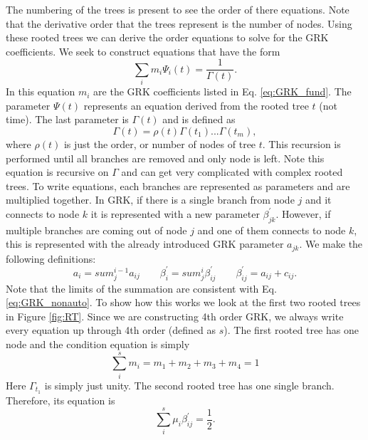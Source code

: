 \documentclass{ansconf}
\numberwithin{equation}{section}
\begin{document}
The numbering of the trees is present to see the order of there equations. Note that the derivative order that the trees represent is the number of nodes. Using these rooted trees we can derive the order equations to solve for the GRK coefficients. We seek to construct equations that have the form
\begin{equation} \label{eq:RT_psi}
    \sum_i m_i \Psi_i\left(t\right) = \frac{1}{\Gamma\left(t\right)}.
\end{equation}
In this equation $m_i$ are the GRK coefficients listed in Eq. \eqref{eq:GRK_fund}. The parameter $\Psi\left(t\right)$ represents an equation derived from the rooted tree $t$ (not time). The last parameter is $\Gamma\left(t\right)$ and is defined as
\begin{equation}
    \Gamma\left(t\right) = \rho\left(t\right)\Gamma\left(t_1\right) ... \Gamma\left(t_m\right),
\end{equation}
where $\rho\left(t\right)$ is just the order, or number of nodes of tree $t$. This recursion is performed until all branches are removed and only node is left. Note this equation is recursive on $\Gamma$ and can get very complicated with complex rooted trees. To write equations, each branches are represented as parameters and are multiplied together. In GRK, if there is a single branch from node $j$ and it connects to node $k$ it is represented with a new parameter $\beta^\prime_{jk}$. However, if multiple branches are coming out of node $j$ and one of them connects to node $k$, this is represented with the already introduced GRK parameter $a_{jk}$. We make the following definitions:
\begin{equation}\label{eq:RT_simp}
    a_{i} = sum_j^{i-1} a_{ij} \qquad \beta^\prime_i = sum_j^i \beta^\prime_{ij} \qquad \beta^\prime_{ij} = a_{ij} + c_{ij}.
\end{equation}
Note that the limits of the summation are consistent with Eq. \eqref{eq:GRK_nonauto}. To show how this works we look at the first two rooted trees in Figure \ref{fig:RT}. Since we are constructing 4th order GRK, we always write every equation up through 4th order (defined as $s$). The first rooted tree has one node and the condition equation is simply
\begin{equation} \label{eq:RT_t1}
    \sum_i^s m_i = m_1 + m_2 + m_3 + m_4 = 1
\end{equation}
Here $\Gamma_{t_1}$ is simply just unity. The second rooted tree has one single branch. Therefore, its equation is
\begin{equation}
    \sum_i^s \mu_i\beta^\prime_{ij} = \frac{1}{2}. 
\end{equation}
\end{document}
